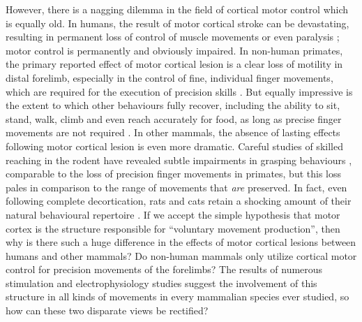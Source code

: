 However, there is a nagging dilemma in the field of cortical motor control which is equally old. In humans, the result of motor cortical stroke can be devastating, resulting in permanent loss of control of muscle movements or even paralysis \cite{Laplane1977}; motor control is permanently and obviously impaired. In non-human primates, the primary reported effect of motor cortical lesion is a clear loss of motility in distal forelimb, especially in the control of fine, individual finger movements, which are required for the execution of precision skills \cite{Leyton1917,Darling2011}. But equally impressive is the extent to which other behaviours fully recover, including the ability to sit, stand, walk, climb and even reach accurately for food, as long as precise finger movements are not required \cite{Leyton1917,Darling2011,Zaaimi2012}. In other mammals, the absence of lasting effects following motor cortical lesion is even more dramatic. Careful studies of skilled reaching in the rodent have revealed subtle impairments in grasping behaviours \cite{Alaverdashvili2008a}, comparable to the loss of precision finger movements in primates, but this loss pales in comparison to the range of movements that \emph{are} preserved. In fact, even following complete decortication, rats and cats retain a shocking amount of their natural behavioural repertoire \cite{Bjursten1976,Terry1989}. If we accept the simple hypothesis that motor cortex is the structure responsible for ``voluntary movement production'', then why is there such a huge difference in the effects of motor cortical lesions between humans and other mammals? Do non-human mammals only utilize cortical motor control for precision movements of the forelimbs? The results of numerous stimulation and electrophysiology studies suggest the involvement of this structure in all kinds of movements in every mammalian species ever studied, so how can these two disparate views be rectified?

